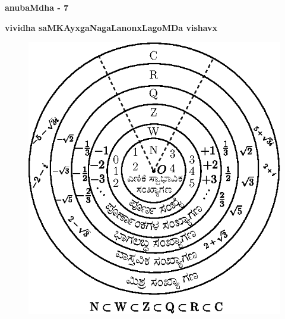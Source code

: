 \newpage

\begin{center}
{\huge\bf anubaMdha - 7}
\bigskip

{\large\bf vividha saMKAyxgaNagaLanonxLagoMDa vishavx}
\smallskip

{\large\bf {}}
\end{center}

\begin{figure}[H]
\centering
\includegraphics{figures/app25.eps}
\end{figure}

\newpage

